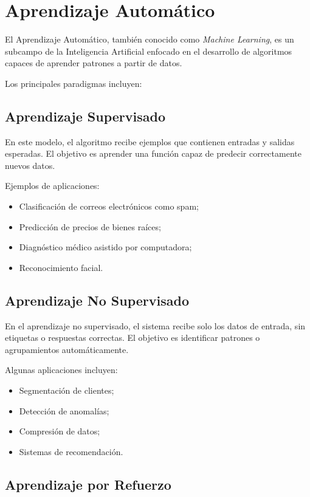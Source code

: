 \documentclass[11pt]{article}
\begin{document}
\section{Aprendizaje Automático}

El Aprendizaje Automático, también conocido como \textit{Machine Learning}, es un subcampo de la
Inteligencia Artificial enfocado en el desarrollo de algoritmos capaces de aprender patrones a
partir de datos.

Los principales paradigmas incluyen: 

\subsection{Aprendizaje Supervisado}

En este modelo, el algoritmo recibe ejemplos que contienen entradas y salidas esperadas. El objetivo es
aprender una función capaz de predecir correctamente nuevos datos.

Ejemplos de aplicaciones:

\begin{itemize}
    \item Clasificación de correos electrónicos como spam;
    \item Predicción de precios de bienes raíces;
    \item Diagnóstico médico asistido por computadora;
    \item Reconocimiento facial.
\end{itemize}
 

\subsection{Aprendizaje No Supervisado}

En el aprendizaje no supervisado, el sistema recibe solo los datos de entrada, sin etiquetas
o respuestas correctas. El objetivo es identificar patrones o agrupamientos automáticamente.

Algunas aplicaciones incluyen:

\begin{itemize}
    \item Segmentación de clientes;
    \item Detección de anomalías;
    \item Compresión de datos;
    \item Sistemas de recomendación.
\end{itemize} 

\subsection{Aprendizaje por Refuerzo}
\end{document}
